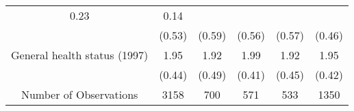 \begin{tabular}{llllll}
  \multicolumn{1}{c}{0.23} &
  \multicolumn{1}{c}{0.14} \\
\multicolumn{1}{l}{} &
  \multicolumn{1}{|c}{(0.53)} &
  \multicolumn{1}{c}{(0.59)} &
  \multicolumn{1}{c}{(0.56)} &
  \multicolumn{1}{c}{(0.57)} &
  \multicolumn{1}{c}{(0.46)} \\
\multicolumn{1}{l}{General health status (1997)} &
  \multicolumn{1}{|c}{1.95} &
  \multicolumn{1}{c}{1.92} &
  \multicolumn{1}{c}{1.99} &
  \multicolumn{1}{c}{1.92} &
  \multicolumn{1}{c}{1.95} \\
\multicolumn{1}{l}{} &
  \multicolumn{1}{|c}{(0.44)} &
  \multicolumn{1}{c}{(0.49)} &
  \multicolumn{1}{c}{(0.41)} &
  \multicolumn{1}{c}{(0.45)} &
  \multicolumn{1}{c}{(0.42)} \\
\multicolumn{1}{c}{Number of Observations} &
  \multicolumn{1}{|c}{3158} &
  \multicolumn{1}{c}{700} &
  \multicolumn{1}{c}{571} &
  \multicolumn{1}{c}{533} &
  \multicolumn{1}{c}{1350} \\
\cline{1-6}
\end{tabular}

